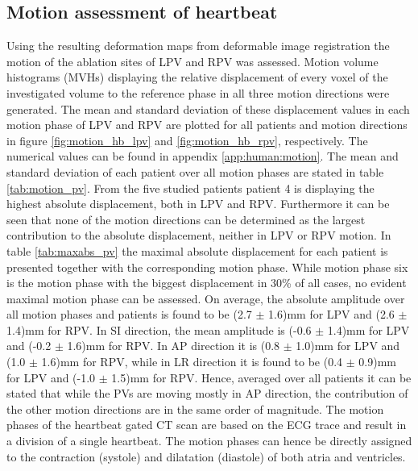 \subsection{Motion assessment of heartbeat}
\label{human:motionheart}
Using the resulting deformation maps from deformable image registration the motion of the ablation sites of LPV and RPV was assessed. Motion 
volume histograms (MVHs) \cite{Ric13} displaying the relative displacement of every voxel of the investigated volume to the reference phase in 
all three motion directions were generated. The mean and standard deviation of these displacement values in each motion phase of LPV and RPV 
are plotted for all patients and motion directions in figure \ref{fig:motion_hb_lpv} and \ref{fig:motion_hb_rpv}, respectively. The numerical 
values can be found in appendix \ref{app:human:motion}. \newline
\newline
The mean and standard deviation of each patient over all motion phases are stated in table \ref{tab:motion_pv}. 
From the five studied patients patient 4 is displaying the highest absolute displacement, both in LPV and RPV. 
Furthermore it can be seen that none of the motion directions can be determined as the largest contribution to the absolute displacement, 
neither in LPV or RPV motion. 
In table \ref{tab:maxabs_pv} the maximal absolute displacement for each patient is presented together with the corresponding motion 
phase. While motion phase six is the motion phase with the biggest displacement in 30\% of all cases, no evident maximal motion phase can be 
assessed. On average, the absolute amplitude over all motion phases and patients is found to be (2.7 $\pm$ 1.6)mm for LPV and 
(2.6 $\pm$ 1.4)mm for RPV. In SI direction, the mean amplitude is (-0.6 $\pm$ 1.4)mm for LPV and (-0.2 $\pm$ 1.6)mm for RPV. In AP 
direction it is (0.8 $\pm$ 1.0)mm for LPV and (1.0 $\pm$ 1.6)mm for RPV, while in LR direction it is found to be (0.4 $\pm$ 0.9)mm for LPV 
and (-1.0 $\pm$ 1.5)mm for RPV. Hence, averaged over all patients it can be stated that while the PVs are moving mostly in AP direction, 
the contribution of the other motion directions are in the same order of magnitude.\newline 
\newline
The motion phases of the heartbeat gated CT scan are based on the ECG trace and result in a division of a single heartbeat. The 
motion phases can hence be directly assigned to the contraction (systole) and dilatation (diastole) of both atria and ventricles.  
